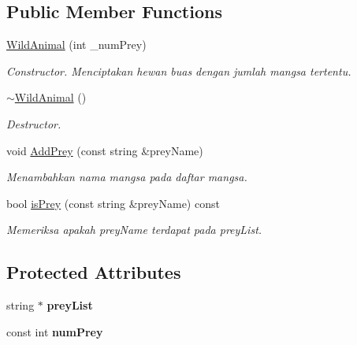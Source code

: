 \subsection*{Public Member Functions}
\begin{DoxyCompactItemize}
\item 
\hypertarget{classWildAnimal_a3cdd77a1d03be27dc158981e71981384}{\hyperlink{classWildAnimal_a3cdd77a1d03be27dc158981e71981384}{Wild\+Animal} (int \+\_\+num\+Prey)}\label{classWildAnimal_a3cdd77a1d03be27dc158981e71981384}

\begin{DoxyCompactList}\small\item\em Constructor. Menciptakan hewan buas dengan jumlah mangsa tertentu. \end{DoxyCompactList}\item 
\hypertarget{classWildAnimal_a6ed385ed8a33fe29110ad7f4d05fb897}{\hyperlink{classWildAnimal_a6ed385ed8a33fe29110ad7f4d05fb897}{$\sim$\+Wild\+Animal} ()}\label{classWildAnimal_a6ed385ed8a33fe29110ad7f4d05fb897}

\begin{DoxyCompactList}\small\item\em Destructor. \end{DoxyCompactList}\item 
void \hyperlink{classWildAnimal_a3de85fd9006a69189b2c142cda11e5a2}{Add\+Prey} (const string \&prey\+Name)
\begin{DoxyCompactList}\small\item\em Menambahkan nama mangsa pada daftar mangsa. \end{DoxyCompactList}\item 
bool \hyperlink{classWildAnimal_a41475480d5e6b6ed07a18847e8cb5261}{is\+Prey} (const string \&prey\+Name) const 
\begin{DoxyCompactList}\small\item\em Memeriksa apakah prey\+Name terdapat pada prey\+List. \end{DoxyCompactList}\end{DoxyCompactItemize}
\subsection*{Protected Attributes}
\begin{DoxyCompactItemize}
\item 
\hypertarget{classWildAnimal_adcecee0efd159b656bcc03f3fbf0fa9e}{string $\ast$ {\bfseries prey\+List}}\label{classWildAnimal_adcecee0efd159b656bcc03f3fbf0fa9e}

\item 
\hypertarget{classWildAnimal_a3b941f33e34c5451eeabb452d6a095f9}{const int {\bfseries num\+Prey}}\label{classWildAnimal_a3b941f33e34c5451eeabb452d6a095f9}

\end{DoxyCompactItemize}


